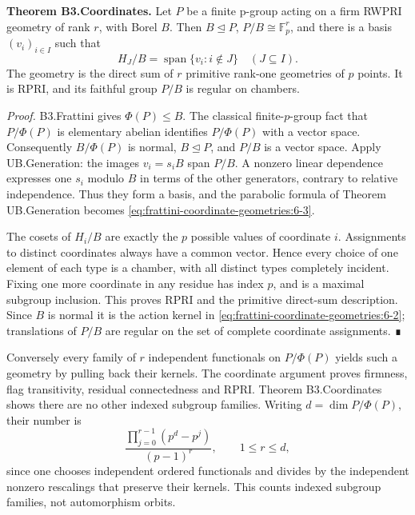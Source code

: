 \textbf{Theorem B3.Coordinates.} Let \(P\) be a finite p-group acting on a firm RWPRI geometry of rank \(r\), with Borel \(B\). Then \(B\unlhd P\), \(P/B\cong\mathbb F_p^r\), and there is a basis \((v_i)_{i\in I}\) such that \begin{equation}
H_J/B=\operatorname{span}\{v_i:i\notin J\}\quad(J\subseteq I).
\label{eq:frattini-coordinate-geometries:6-3}
\end{equation} The geometry is the direct sum of \(r\) primitive rank-one geometries of \(p\) points. It is RPRI, and its faithful group \(P/B\) is regular on chambers.

\emph{Proof.} B3.Frattini gives \(\Phi(P)\leq B\). The classical finite-$p$-group fact that \(P/\Phi(P)\) is elementary abelian identifies \(P/\Phi(P)\) with a vector space. Consequently \(B/\Phi(P)\) is normal, \(B\unlhd P\), and \(P/B\) is a vector space. Apply UB.Generation: the images \(v_i=s_iB\) span \(P/B\). A nonzero linear dependence expresses one \(s_i\) modulo \(B\) in terms of the other generators, contrary to relative independence. Thus they form a basis, and the parabolic formula of Theorem UB.Generation becomes \eqref{eq:frattini-coordinate-geometries:6-3}.

The cosets of \(H_i/B\) are exactly the \(p\) possible values of coordinate \(i\). Assignments to distinct coordinates always have a common vector. Hence every choice of one element of each type is a chamber, with all distinct types completely incident. Fixing one more coordinate in any residue has index \(p\), and is a maximal subgroup inclusion. This proves RPRI and the primitive direct-sum description. Since \(B\) is normal it is the action kernel in \eqref{eq:frattini-coordinate-geometries:6-2}; translations of \(P/B\) are regular on the set of complete coordinate assignments. ∎

Conversely every family of \(r\) independent functionals on \(P/\Phi(P)\) yields such a geometry by pulling back their kernels. The coordinate argument proves firmness, flag transitivity, residual connectedness and RPRI. Theorem B3.Coordinates shows there are no other indexed subgroup families. Writing \(d=\dim P/\Phi(P)\), their number is \begin{equation}
\frac{\prod_{j=0}^{r-1}(p^d-p^j)}{(p-1)^r},\qquad 1\leq r\leq d,
\label{eq:frattini-coordinate-geometries:6-4}
\end{equation} since one chooses independent ordered functionals and divides by the independent nonzero rescalings that preserve their kernels. This counts indexed subgroup families, not automorphism orbits.

